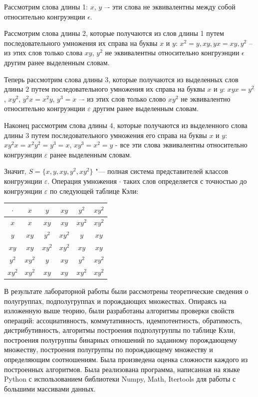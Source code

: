 \documentclass[bachelor, och, labwork]{shiza}
\begin{document}
    Рассмотрим слова длины 1: $x$, $y$ –- эти слова не эквивалентны между собой относительно конгруэнции $\epsilon$.

    Рассмотрим слова длины 2, которые получаются из слов
    длины 1 путем последовательного умножения их справа на буквы $x$ и $y$: $x^2 = y, xy, yx = xy, y^2$ -- из этих 
    слов только слова $xy$, $y^2$ не эквивалентны относительно конгруэнции $\epsilon$ другим ранее выделенным словам.

    Теперь рассмотрим слова длины $3$, которые получаются из выделенных слов длины $2$ путем последовательного
    умножения их справа на буквы $x$ и $y$: $xyx = y^2$, $xy^2$,  $y^2x = x^2y$, $y^3 = x$ –- из этих слов только
    слово $xy^2$ не эквивалентно относительно конгруэнции $\varepsilon$ другим ранее выделенным словам.

    Наконец рассмотрим слова длины $4$, которые получаются из выделенного слова длины $3$ путем последовательного
    умножения его справа на буквы $x$ и $y$: $xy^2x = x^2y^2 = y^3 = x$, $xy^3 = x^2 = y$ - все эти слова эквивалентны
    относительно конгруэнции $\varepsilon$ ранее выделенным словам.

        Значит, $S = \{x, y, xy, y^2, xy^2 \}$ "--- полная система представителей классов конгруэнции $\varepsilon$.
        Операция умножения $\cdot$ таких слов определяется с точностью до конгруэнции $\varepsilon$ по следующей таблице
        Кэли:

     \begin{table}[H]
          \centering
          \begin{tabular}{|c|c|c|c|c|c|}
          \hline
          $\cdot $ & $x$ & $y$  & $xy$  & $y^2$ & $xy^2$ \\ \hline
          $x$      & $x$ & $xy$ & $xy$  & $xy^2$ & $xy^2$ \\ \hline
          $y$      & $xy$ & $y^2$ & $xy^2$ & $y$ & $xy$ \\ \hline
          $xy$     & $xy$ & $xy^2$ & $xy^2$ & $xy$ & $xy$ \\ \hline
          $y^2$    & $xy^2$ & $y$ & $xy$ & $y^2$ & $xy^2$ \\ \hline
          $xy^2$   & $xy^2$ &  $xy$  &  $xy$ & $xy^2$ & $xy^2$ \\ \hline
          \end{tabular}
        \end{table}
    \conclusion
    
    В результате лабораторной работы были рассмотрены теоретические сведения о полугруппах, подполугруппах и
    порождающих множествах. Опираясь на изложенную
    выше теорию, были разработаны алгоритмы проверки свойств операций: ассоциативность, коммутативность, идемпотентность, обратимость,
    дистрибутивность, алгоритмы построения подполугруппы по таблице Кэли, построения
    полугруппы бинарных отношений по заданному порождающему множеству, построения полугруппы по порождающему множеству и
    определяющим соотношениям. Была произведена оценка сложности каждого из  построенных алгоритмов. Была реализована программа, написанная на языке Python
    с использованием библиотеки Numpy, Math, Itertools для работы с большими массивами данных.
    
\end{document}
